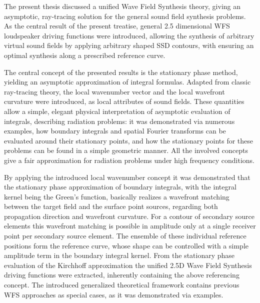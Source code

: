 The present thesis discussed a unified Wave Field Synthesis theory, giving an asymptotic, ray-tracing solution for the general sound field synthesis problems.
As the central result of the present treatise, general 2.5 dimensional WFS loudspeaker driving functions were introduced, allowing the synthesis of arbitrary virtual sound fields by applying arbitrary shaped SSD contours, with ensuring an optimal synthesis along a prescribed reference curve.

The central concept of the presented results is the stationary phase method, yielding an asymptotic approximation of integral formulas.
Adapted from classic ray-tracing theory, the local wavenumber vector and the local wavefront curvature were introduced, as local attributes of sound fields.
These quantities allow a simple, elegant physical interpretation of asymptotic evaluation of integrals, describing radiation problems: it was demonstrated via numerous examples, how boundary integrals and spatial Fourier transforms can be evaluated around their stationary points, and how the stationary points for these problems can be found in a simple geometric manner.
All the involved concepts give a fair approximation for radiation problems under high frequency conditions.

By applying the introduced local wavenumber concept it was demonstrated that the stationary phase approximation of boundary integrals, with the integral kernel being the Green's function, basically realizes a wavefront matching between the target field and the surface point sources, regarding both propagation direction and wavefront curvature.
For a contour of secondary source elements this wavefront matching is possible in amplitude only at a single receiver point per secondary source element.
The ensemble of these individual reference positions form the reference curve, whose shape can be controlled with a simple amplitude term in the boundary integral kernel.
From the stationary phase evaluation of the Kirchhoff approximation the unified 2.5D Wave Field Synthesis driving functions were extracted, inherently containing the above referencing concept.
The introduced generalized theoretical framework contains previous WFS approaches as special cases, as it was demonstrated via examples.

